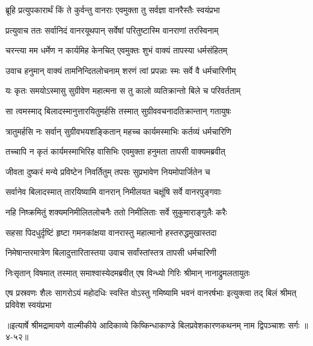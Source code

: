 \twolineshloka
{ब्रूहि प्रत्युपकारार्थं किं ते कुर्वन्तु वानराः}
{एवमुक्ता तु सर्वज्ञा वानरैस्तैः स्वयंप्रभा} %

\twolineshloka
{प्रत्युवाच ततः सर्वानिदं वानरयूथपान्}
{सर्वेषां परितुष्टास्मि वानराणां तरस्विनाम्} %

\twolineshloka
{चरन्त्या मम धर्मेण न कार्यमिह केनचित्}
{एवमुक्तः शुभं वाक्यं तापस्या धर्मसंहितम्} %

\twolineshloka
{उवाच हनुमान् वाक्यं तामनिन्दितलोचनाम्}
{शरणं त्वां प्रपन्नाः स्मः सर्वे वै धर्मचारिणीम्} %

\twolineshloka
{यः कृतः समयोऽस्मासु सुग्रीवेण महात्मना}
{स तु कालो व्यतिक्रान्तो बिले च परिवर्तताम्} %

\twolineshloka
{सा त्वमस्माद् बिलादस्मानुत्तारयितुमर्हसि}
{तस्मात् सुग्रीववचनादतिक्रान्तान् गतायुषः} %

\twolineshloka
{त्रातुमर्हसि नः सर्वान् सुग्रीवभयशङ्कितान्}
{महच्च कार्यमस्माभिः कर्तव्यं धर्मचारिणि} %

\twolineshloka
{तच्चापि न कृतं कार्यमस्माभिरिह वासिभिः}
{एवमुक्ता हनुमता तापसी वाक्यमब्रवीत्} %

\twolineshloka
{जीवता दुष्करं मन्ये प्रविष्टेन निवर्तितुम्}
{तपसः सुप्रभावेण नियमोपार्जितेन च} %

\twolineshloka
{सर्वानेव बिलादस्मात् तारयिष्यामि वानरान्}
{निमीलयत चक्षूंषि सर्वे वानरपुङ्गवाः} %

\twolineshloka
{नहि निष्क्रमितुं शक्यमनिमीलितलोचनैः}
{ततो निमीलिताः सर्वे सुकुमाराङ्गुलैः करैः} %

\twolineshloka
{सहसा पिदधुर्दृष्टिं हृष्टा गमनकांक्षया}
{वानरास्तु महात्मानो हस्तरुद्धमुखास्तदा} %

\twolineshloka
{निमेषान्तरमात्रेण बिलादुत्तारितास्तया}
{उवाच सर्वांस्तांस्तत्र तापसी धर्मचारिणी} %

\twolineshloka
{निःसृतान् विषमात् तस्मात् समाश्वास्येदमब्रवीत्}
{एष विन्ध्यो गिरिः श्रीमान् नानाद्रुमलतायुतः} %

\threelineshloka
{एष प्रस्रवणः शैलः सागरोऽयं महोदधिः}
{स्वस्ति वोऽस्तु गमिष्यामि भवनं वानरर्षभाः}
{इत्युक्त्वा तद् बिलं श्रीमत् प्रविवेश स्वयंप्रभा} %


॥इत्यार्षे श्रीमद्रामायणे वाल्मीकीये आदिकाव्ये किष्किन्धाकाण्डे बिलप्रवेशकारणकथनम् नाम द्विपञ्चाशः सर्गः ॥४-५२॥
